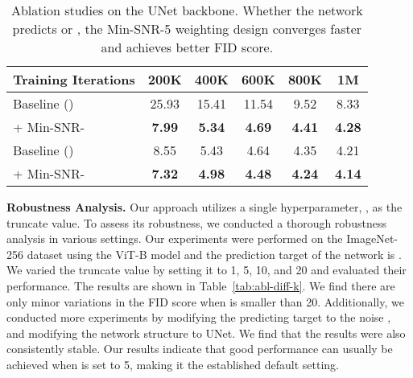 \begin{table}[t]
\begin{center}
\setlength{\tabcolsep}{1.5mm}
\begin{tabular}{l c c c c c}
\toprule
Training Iterations & 200K & 400K & 600K & 800K & 1M \\
\midrule
Baseline () & 25.93 & 15.41 & 11.54 & 9.52 & 8.33 \\
+ Min-SNR- & \textbf{7.99} & \textbf{5.34} & \textbf{4.69} & \textbf{4.41} & \textbf{4.28} \\
\midrule
Baseline () & 8.55 & 5.43 & 4.64 & 4.35 & 4.21 \\
+ Min-SNR- & \textbf{7.32} & \textbf{4.98} & \textbf{4.48} & \textbf{4.24} & \textbf{4.14} \\
\bottomrule
\end{tabular}
\end{center}
\vspace{-5mm}
\caption{
Ablation studies on the UNet backbone. Whether the network predicts  or , the Min-SNR-5 weighting design converges faster and achieves better FID score.
}
\label{tab:abl-unet}
\vspace{-5mm}
\end{table}










\noindent \textbf{Robustness Analysis.}
Our approach utilizes a single hyperparameter, , as the truncate value. To assess its robustness, we conducted a thorough robustness analysis in various settings. Our experiments were performed on the ImageNet-256 dataset using the ViT-B model and the prediction target of the network is . We varied the truncate value  by setting it to 1, 5, 10, and 20 and evaluated their performance. The results are shown in Table~\ref{tab:abl-diff-k}. We find there are only minor variations in the FID score when  is smaller than 20. Additionally, we conducted more experiments by modifying the predicting target to the noise , and modifying the network structure to UNet. We find that the results were also consistently stable. Our results indicate that good performance can usually be achieved when  is set to 5, making it the established default setting.

